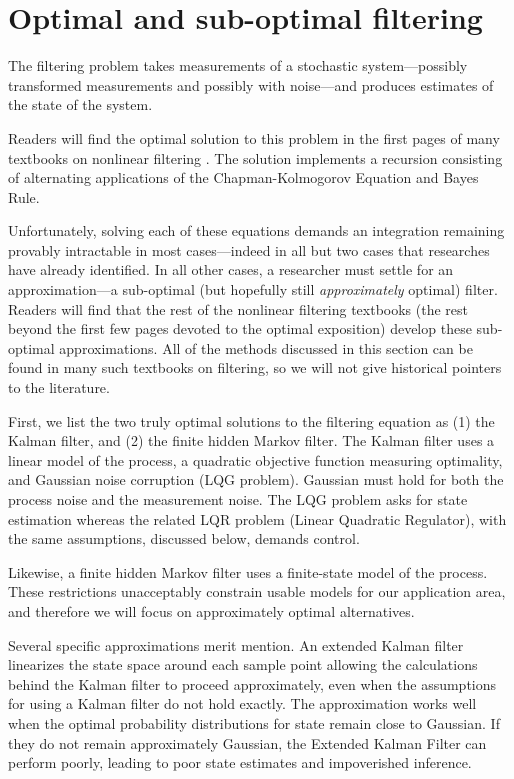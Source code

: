 \documentclass{article}
\begin{document}
\section{Optimal and sub-optimal filtering}
The filtering problem takes measurements of a stochastic
system---possibly transformed measurements and possibly with
noise---and produces estimates of the state of the system.

Readers will find the optimal solution to this problem in the first
pages of many textbooks on nonlinear filtering \cite{ristic2003beyond,
  crisan2011oxford, smith2013sequential, chopin2020introduction}.  The
solution implements a recursion consisting of alternating applications
of the Chapman-Kolmogorov Equation and Bayes Rule.

Unfortunately, solving each of these equations demands an integration
remaining provably intractable in most cases---indeed in all but two
cases that researches have already identified.  In all other cases, a
researcher must settle for an approximation---a sub-optimal (but
hopefully still \emph{approximately} optimal) filter.  Readers will
find that the rest of the nonlinear filtering textbooks (the rest
beyond the first few pages devoted to the optimal exposition) develop
these sub-optimal approximations.  All of the methods discussed in
this section can be found in many such textbooks on filtering, so we
will not give historical pointers to the literature.

First, we list the two truly optimal solutions to the filtering
equation as (1) the Kalman filter, and (2) the finite hidden Markov
filter.  The Kalman filter uses a linear model of the process, a
quadratic objective function measuring optimality, and Gaussian noise
corruption (LQG problem).  Gaussian must hold for both the process
noise and the measurement noise.  The LQG problem asks for state
estimation whereas the related LQR problem (Linear Quadratic
Regulator), with the same assumptions, discussed below, demands
control.

Likewise, a finite hidden Markov filter uses a finite-state model of
the process. These restrictions unacceptably constrain usable models
for our application area, and therefore we will focus on approximately
optimal alternatives.

Several specific approximations merit mention.  An extended Kalman
filter linearizes the state space around each sample point allowing
the calculations behind the Kalman filter to proceed approximately,
even when the assumptions for using a Kalman filter do not hold
exactly. The approximation works well when the optimal probability
distributions for state remain close to Gaussian.  If they do not
remain approximately Gaussian, the Extended Kalman Filter can perform
poorly, leading to poor state estimates and impoverished inference.
\end{document}
